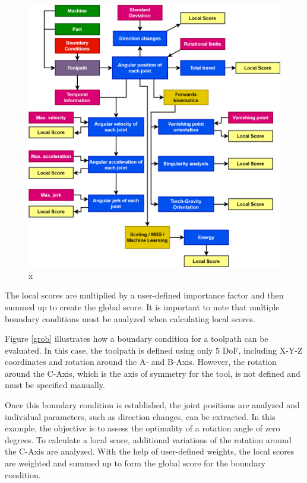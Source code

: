 \begin{figure}[H]
	\centerline{\includegraphics[width=1\textwidth]{figures/flowchart.png}}
	\caption{x}
	\label{allflow}
\end{figure}

The local scores are multiplied by a user-defined importance factor and then summed up to create the global score. It is important to note that multiple boundary conditions must be analyzed when calculating local scores.

Figure \ref{grob} illustrates how a boundary condition for a toolpath can be evaluated. In this case, the toolpath is defined using only 5 DoF, including X-Y-Z coordinates and rotation around the A- and B-Axis. However, the rotation around the C-Axis, which is the axis of symmetry for the tool, is not defined and must be specified manually.


Once this boundary condition is established, the joint positions are analyzed and individual parameters, such as direction changes, can be extracted. In this example, the objective is to assess the optimality of a rotation angle of zero degrees.
To calculate a local score, additional variations of the rotation around the C-Axis are analyzed. With the help of user-defined weights, the local scores are weighted and summed up to form the global score for the boundary condition.


